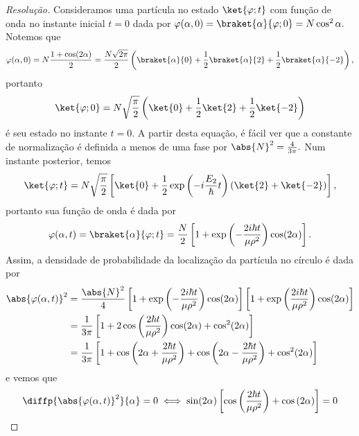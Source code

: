 \begin{proof}[Resolução]
   Consideramos uma partícula no estado \(\ket{\varphi; t}\) com função de onda no instante inicial \(t = 0\) dada por \(\varphi(\alpha, 0) = \braket{\alpha}{\varphi; 0} = N \cos^2 \alpha.\) Notemos que
   \begin{equation*}
      \varphi(\alpha, 0) = N\frac{1 + \cos(2\alpha)}{2} = \frac{N\sqrt{2\pi}}{2}\left(\braket{\alpha}{0} + \frac12 \braket{\alpha}{2} + \frac12 \braket{\alpha}{-2}\right),
   \end{equation*}
   portanto
   \begin{equation*}
      \ket{\varphi; 0} = N\sqrt{\frac{\pi}{2}}\left(\ket{0} + \frac12 \ket{2} + \frac12 \ket{-2}\right)
   \end{equation*}
   é seu estado no instante \(t = 0.\) A partir desta equação, é fácil ver que a constante de normalização é definida a menos de uma fase por \(\abs{N}^2 = \frac{4}{3\pi}.\) Num instante posterior, temos
   \begin{equation*}
      \ket{\varphi; t} = N\sqrt{\frac{\pi}{2}} \left[\ket{0} + \frac12 \exp\left(-i\frac{E_2}{\hbar}t\right)\left(\ket{2} + \ket{-2}\right)\right],
   \end{equation*}
   portanto sua função de onda é dada por
   \begin{equation*}
      \varphi(\alpha, t) = \braket{\alpha}{\varphi; t} = \frac{N}{2}\left[1 + \exp\left(-\frac{2i \hbar t}{\mu \rho^2}\right)\cos(2\alpha)\right].
   \end{equation*}
   Assim, a densidade de probabilidade da localização da partícula no círculo é dada por
   \begin{align*}
      \abs{\varphi(\alpha, t)}^2 &= \frac{\abs{N}^2}{4} \left[1 + \exp\left(-\frac{2i \hbar t}{\mu \rho^2}\right)\cos(2\alpha)\right]\left[1 + \exp\left(\frac{2i \hbar t}{\mu \rho^2}\right)\cos(2\alpha)\right]\\
                                 &= \frac{1}{3\pi} \left[1 + 2\cos\left(\frac{2 \hbar t}{\mu \rho^2}\right)\cos(2\alpha) + \cos^2(2\alpha)\right]\\
                                 &= \frac{1}{3\pi} \left[1 + \cos\left(2\alpha+\frac{2 \hbar t}{\mu \rho^2}\right) + \cos\left(2\alpha-\frac{2 \hbar t}{\mu \rho^2}\right) + \cos^2(2\alpha)\right]
   \end{align*}
   e vemos que
   \begin{align*}
      \diffp{\abs{\varphi(\alpha, t)}^2}{\alpha} = 0 &\iff \sin(2\alpha) \left[\cos\left(\frac{2\hbar t}{\mu \rho^2}\right) + \cos\left(2\alpha\right)\right] = 0\\

\end{align*}
\end{proof}
